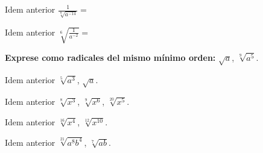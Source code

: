 \documentclass[12pt,addpoints,x11names]{exam}
\begin{document}
\begin{questions}
\begin{multicols}{2}
    \question Idem anterior $\frac{1}{\sqrt[8]{a^{-14}}}=$

    \question Idem anterior $\sqrt[6]{\frac{1}{a^{-2}}}=$

    \question \textbf{Exprese como radicales del mismo mínimo orden:} $\sqrt{a}$, $\sqrt[9]{a^5}$.
      
    \question Idem anterior $\sqrt[5]{a^3}$, $\sqrt{a}$.
      
    \question Idem anterior $\sqrt[8]{x^3}$, $\sqrt[9]{x^6}$, $\sqrt[20]{x^5}$.
      
    \question Idem anterior $\sqrt[16]{x^4}$, $\sqrt[12]{x^{10}}$.
      
    \question Idem anterior $\sqrt[21]{a^8b^4}$, $\sqrt[7]{ab}$.

  
\end{multicols}
\end{questions}
\end{document}
